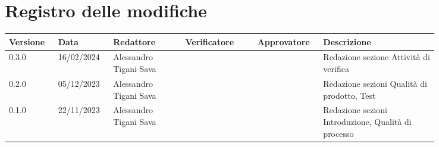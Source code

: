 \section*{Registro delle modifiche}
{
\renewcommand{\arraystretch}{1.5}
\scriptsize
\begin{longtable}{p{0.10\linewidth}p{0.10\linewidth}p{0.15\linewidth}p{0.15\linewidth}p{0.10\linewidth}p{0.24\linewidth}}
	\textbf{Versione} & \textbf{Data} & \textbf{Redattore}	& \textbf{Verificatore} & \textbf{Approvatore} & \textbf{Descrizione}	\\
	\toprule
	0.3.0	& 16/02/2024	& Alessandro Tigani Sava	& 	&	& Redazione sezione Attività di verifica	\\
	\hline
	0.2.0 	& 05/12/2023	& Alessandro Tigani Sava 	&	&	& Redazione sezioni Qualità di prodotto, Test \\
	\hline
	0.1.0	& 22/11/2023    & Alessandro Tigani Sava	&	&	& Redazione sezioni Introduzione, Qualità di processo	\\
	\bottomrule
\end{longtable}
}